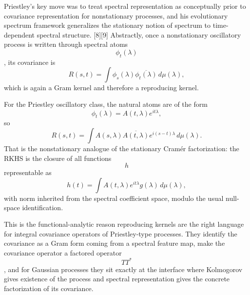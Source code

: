 \documentclass[
]{article}
\begin{document}
Priestley's key move was to treat spectral representation as
conceptually prior to covariance representation for nonstationary
processes, and his evolutionary spectrum framework generalizes the
stationary notion of spectrum to time-dependent spectral structure.
{[}8{]}{[}9{]} Abstractly, once a nonstationary oscillatory process is
written through spectral atoms \[\phi_t(\lambda)\], its covariance is \[
R(s,t)=\int \phi_s(\lambda)\overline{\phi_t(\lambda)}\,d\mu(\lambda),
\] which is again a Gram kernel and therefore a reproducing kernel.

For the Priestley oscillatory class, the natural atoms are of the form
\[
\phi_t(\lambda)=A(t,\lambda)e^{it\lambda},
\] so \[
R(s,t)=\int A(s,\lambda)\overline{A(t,\lambda)}e^{i(s-t)\lambda}\,d\mu(\lambda).
\] That is the nonstationary analogue of the stationary Cramér
factorization: the RKHS is the closure of all functions \[h\]
representable as \[
h(t)=\int A(t,\lambda)e^{it\lambda}g(\lambda)\,d\mu(\lambda),
\] with norm inherited from the spectral coefficient space, modulo the
usual null-space identification.

This is the functional-analytic reason reproducing kernels are the right
language for integral covariance operators of Priestley-type processes.
They identify the covariance as a Gram form coming from a spectral
feature map, make the covariance operator a factored operator \[T T^*\],
and for Gaussian processes they sit exactly at the interface where
Kolmogorov gives existence of the process and spectral representation
gives the concrete factorization of its covariance.
\end{document}
